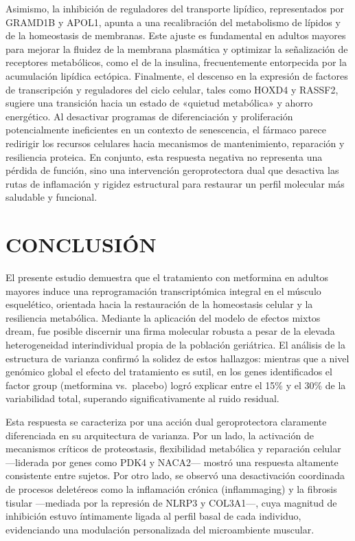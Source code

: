 \documentclass[
  spanish,
  11pt,
]{article}
\begin{document}
Asimismo, la inhibición de reguladores del transporte lipídico,
representados por GRAMD1B y APOL1, apunta a una recalibración del
metabolismo de lípidos y de la homeostasis de membranas. Este ajuste es
fundamental en adultos mayores para mejorar la fluidez de la membrana
plasmática y optimizar la señalización de receptores metabólicos, como
el de la insulina, frecuentemente entorpecida por la acumulación
lipídica ectópica. Finalmente, el descenso en la expresión de factores
de transcripción y reguladores del ciclo celular, tales como HOXD4 y
RASSF2, sugiere una transición hacia un estado de «quietud metabólica» y
ahorro energético. Al desactivar programas de diferenciación y
proliferación potencialmente ineficientes en un contexto de senescencia,
el fármaco parece redirigir los recursos celulares hacia mecanismos de
mantenimiento, reparación y resiliencia proteica. En conjunto, esta
respuesta negativa no representa una pérdida de función, sino una
intervención geroprotectora dual que desactiva las rutas de inflamación
y rigidez estructural para restaurar un perfil molecular más saludable y
funcional.

\section{CONCLUSIÓN}\label{conclusiuxf3n}

El presente estudio demuestra que el tratamiento con metformina en
adultos mayores induce una reprogramación transcriptómica integral en el
músculo esquelético, orientada hacia la restauración de la homeostasis
celular y la resiliencia metabólica. Mediante la aplicación del modelo
de efectos mixtos dream, fue posible discernir una firma molecular
robusta a pesar de la elevada heterogeneidad interindividual propia de
la población geriátrica. El análisis de la estructura de varianza
confirmó la solidez de estos hallazgos: mientras que a nivel genómico
global el efecto del tratamiento es sutil, en los genes identificados el
factor group (metformina vs.~placebo) logró explicar entre el 15\% y el
30\% de la variabilidad total, superando significativamente al ruido
residual.

Esta respuesta se caracteriza por una acción dual geroprotectora
claramente diferenciada en su arquitectura de varianza. Por un lado, la
activación de mecanismos críticos de proteostasis, flexibilidad
metabólica y reparación celular ---liderada por genes como PDK4 y
NACA2--- mostró una respuesta altamente consistente entre sujetos. Por
otro lado, se observó una desactivación coordinada de procesos
deletéreos como la inflamación crónica (inflammaging) y la fibrosis
tisular ---mediada por la represión de NLRP3 y COL3A1---, cuya magnitud
de inhibición estuvo íntimamente ligada al perfil basal de cada
individuo, evidenciando una modulación personalizada del microambiente
muscular.
\end{document}
